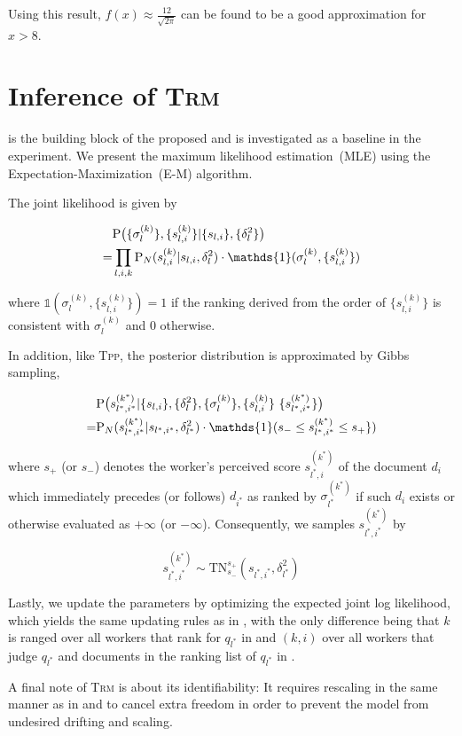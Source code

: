 Using this result, $f(x) \approx \frac{12}{\sqrt{2\pi}}$ can be found to be a
good approximation for $x > 8$.

\section{Inference of \textsc{Trm}} \label{app::trm}

\trm{} is the building block of the proposed \tpp{} and is investigated as a
baseline in the experiment. We present the maximum likelihood estimation~(MLE)
using the Expectation-Maximization~(E-M) algorithm.

The joint likelihood is given by

\begin{align}
& \P\big(\{\sigma_l^{(k)}\}, \{s_{l,i}^{(k)}\} |
    \{s_{l,i}\}, \{\delta_l^2\}\big)  \nonumber \\
=
& \prod_{l,i,k} \P_N(s_{l,i}^{(k)} | s_{l,i}, \delta_l^2) \cdot
  \mathds{1}(\sigma_l^{(k)}, \{s_{l,i}^{(k)} \})
\end{align}

where $\mathds{1}(\sigma_l^{(k)}, \{s_{l,i}^{(k)} \}) = 1$ if the ranking
derived from the order of $\{s_{l,i}^{(k)} \}$ is consistent with
$\sigma_l^{(k)}$ and $0$ otherwise.

In addition, like \textsc{Tpp}, the posterior distribution is approximated by
Gibbs sampling,

\begin{align}
& \P\big( s_{l^*,i^*}^{(k^*)} | \{s_{l,i}\}, \{\delta_l^2\}, \{\sigma_l^{(k)}\},
            \{s_{l,i}^{(k)}\} \ \{s_{l^*,i^*}^{(k^*)}\} \big)  \nonumber \\
=
& \P_N(s_{l^*,i^*}^{(k^*)} | s_{l^*,i^*}, \delta_{l^*}^2) \cdot
            \mathds{1}(s_{-} \leq s_{l^*,i^*}^{(k^*)} \leq s_{+} \})
\end{align}

where $s_{+}$ (or $s_{-}$) denotes the worker's perceived score
$s_{l^*,i}^{(k^*)}$ of the document $d_i$ which immediately precedes (or
follows) $d_{i^*}$ as ranked by $\sigma_{l^*}^{(k^*)}$ if such $d_i$ exists or
otherwise evaluated as $+\infty$ (or $-\infty$). Consequently, we samples
$s_{l^*,i^*}^{(k^*)}$ by

$$s_{l^*,i^*}^{(k^*)} \sim \mathrm{TN}_{s_{-}}^{s_{+}}
(s_{l^*,i^*}, \delta_{l^*}^2)$$

Lastly, we update the parameters by optimizing the expected joint log
likelihood, which yields the same updating rules as in ,
 with the only difference being that $k$ is ranged over all
workers that rank for $q_{l^*}$ in  and $(k,i)$ over all workers
that judge $q_{l^*}$ and documents in the ranking list of $q_{l^*}$ in
.

A final note of \textsc{Trm} is about its identifiability: It requires rescaling
in the same manner as in  and  to cancel
extra freedom in order to prevent the model from undesired drifting and scaling.

